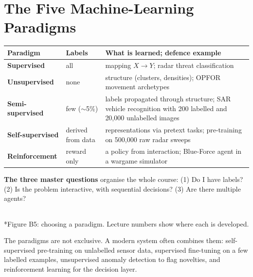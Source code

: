 \documentclass[11pt]{article}
\begin{document}
\section{The Five Machine-Learning Paradigms}
\begin{center}\small\renewcommand{\arraystretch}{1.3}
\begin{tabularx}{\textwidth}{>{\bfseries}l l X}\toprule Paradigm & Labels & What is learned; defence example\\\midrule
Supervised & all & mapping $X\to Y$; radar threat classification\\
Unsupervised & none & structure (clusters, densities); OPFOR movement archetypes\\
Semi-supervised & few ($\sim$5\%) & labels propagated through structure; SAR vehicle recognition with 200 labelled and 20,000 unlabelled images\\
Self-supervised & derived from data & representations via pretext tasks; pre-training on 500,000 raw radar sweeps\\
Reinforcement & reward only & a policy from interaction; Blue-Force agent in a wargame simulator\\\bottomrule
\end{tabularx}\end{center}
\textbf{The three master questions} organise the whole course: (1) Do I have labels? (2) Is the problem interactive, with sequential decisions? (3) Are there multiple agents?
\begin{center}\\*{\small\color{GreyN}Figure B5: choosing a paradigm. Lecture numbers show where each is developed.}\end{center}
The paradigms are not exclusive. A modern system often combines them: self-supervised pre-training on unlabelled sensor data, supervised fine-tuning on a few labelled examples, unsupervised anomaly detection to flag novelties, and reinforcement learning for the decision layer.
\end{document}
